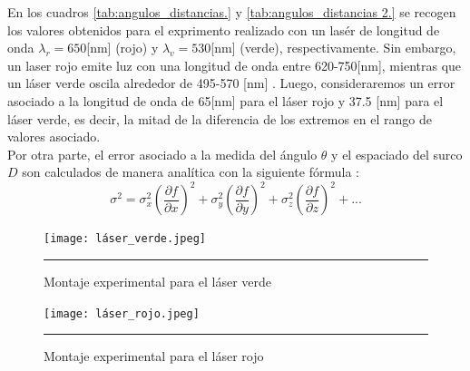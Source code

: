 \documentclass[10pt,a4paper]{article}
\begin{document}
\begin{multicols}{2}
		En los cuadros \ref{tab:angulos_distancias.} y \ref{tab:angulos_distancias 2.} se recogen los valores obtenidos para el exprimento realizado con un lasér de longitud de onda $\lambda_r = 650$[nm]  (rojo) y $\lambda_v = 530$[nm] (verde), respectivamente. Sin embargo, un laser rojo emite luz con una longitud de onda entre 620-750[nm], mientras que un láser verde oscila alrededor de 495-570 [nm] \cite{colors}. Luego, consideraremos un error asociado a la longitud de onda de 65[nm] para el láser rojo y 37.5 [nm] para el láser verde, es decir, la mitad de la diferencia de los extremos en el rango de valores asociado.\\
		
		Por otra parte, el error asociado a la medida del ángulo $\theta$ y el espaciado del surco $D$ son calculados de manera analítica con la siguiente fórmula \cite{error}:
		\begin{equation}
		\sigma^2 = \sigma^2_x \left( \frac{\partial f}{\partial x} \right)^2 + \sigma^2_y \left( \frac{\partial f}{\partial y} \right)^2 + \sigma^2_z \left( \frac{\partial f}{\partial z} \right)^2+...
		\end{equation}
		\newpage
		
		\begin{figure}[H]
			\centering
			\texttt{[image: láser\_verde.jpeg]}
			\caption{Montaje experimental para el láser verde}
			\label{imagen laser verde}
			\rule{80mm}{0.1mm}
		\end{figure}
		
		\begin{figure}[H]
			\centering
			\texttt{[image: láser\_rojo.jpeg]}
			\caption{Montaje experimental para el láser rojo}
			\label{imagen laser rojo}
			\rule{80mm}{0.1mm}
		\end{figure}
	
	
	
		
		
	\end{multicols}
	
\end{document}
